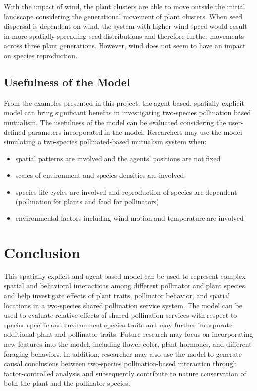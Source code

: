 \documentclass[3p,,preprint,12pt]{elsarticle}
\begin{document}
With the impact of wind, the plant clusters are able to move outside the initial landscape considering the generational movement of plant clusters. When seed dispersal is dependent on wind, the system with higher wind speed would result in more spatially spreading seed distributions and therefore further movements across three plant generations. However, wind does not seem to have an impact on species reproduction. 

\subsection{Usefulness of the Model}
From the examples presented in this project, the agent-based, spatially explicit model can bring significant benefits in investigating two-species pollination based mutualism. The usefulness of the model can be evaluated considering the user-defined parameters incorporated in the model. Researchers may use the model simulating a two-species pollinated-based mutualism system when:
\begin{itemize}
  \item spatial patterns are involved and the agents' positions are not fixed
  \item scales of environment and species densities are involved
  \item species life cycles are involved and reproduction of species are dependent (pollination for plants and food for pollinators)
  \item environmental factors including wind motion and temperature are involved
\end{itemize}

\section{Conclusion}
This spatially explicit and agent-based model can be used to represent complex spatial and behavioral interactions among different pollinator and plant species and help investigate effects of plant traits, pollinator behavior, and spatial locations in a two-species shared pollination service system. The model can be used to evaluate relative effects of shared pollination services with respect to species-specific and environment-species traits and may further incorporate additional plant and pollinator traits. Future research may focus on incorporating new features into the model, including flower color, plant hormones, and different foraging behaviors. In addition, researcher may also use the model to generate causal conclusions between two-species pollination-based interaction through factor-controlled analysis and subsequently contribute to nature conservation of both the plant and the pollinator species.
\pagebreak 
\end{document}
